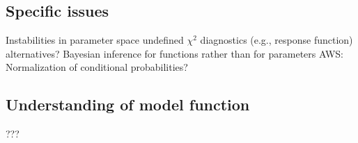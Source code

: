 \subsection{Specific issues}  \label{subsec:issues}

  \bi
    \I Instabilities in parameter space
      \bi
        \I undefined $\chi^2$
        \I diagnostics (e.g., response function) 
        \I alternatives?
      \ei     
      \I Bayesian inference for functions rather than for parameters
      \I AWS: Normalization of conditional probabilities?
  \ei


\subsection{Understanding of model function}  \label{subsec:model_function}

  \bi
    \I ???
  \ei



